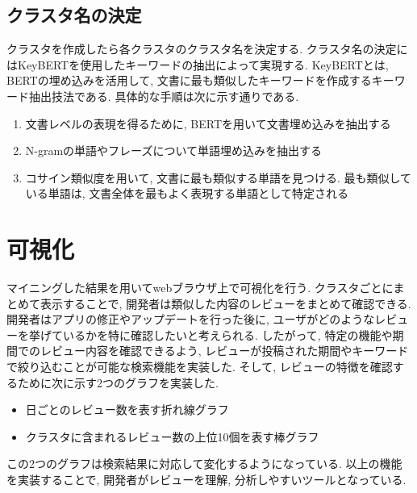 \subsection{クラスタ名の決定}
クラスタを作成したら各クラスタのクラスタ名を決定する. 
クラスタ名の決定にはKeyBERT\cite{keybert}を使用したキーワードの抽出によって実現する. KeyBERTとは, BERTの埋め込みを活用して, 文書に最も類似したキーワードを作成するキーワード抽出技法である. 
具体的な手順は次に示す通りである. 

\begin{enumerate}
  \item 文書レベルの表現を得るために, BERTを用いて文書埋め込みを抽出する
  \item N-gramの単語やフレーズについて単語埋め込みを抽出する
  \item コサイン類似度を用いて, 文書に最も類似する単語を見つける. 最も類似している単語は, 文書全体を最もよく表現する単語として特定される
\end{enumerate}


\section{可視化}
マイニングした結果を用いてwebブラウザ上で可視化を行う. クラスタごとにまとめて表示することで, 開発者は類似した内容のレビューをまとめて確認できる. 
開発者はアプリの修正やアップデートを行った後に, ユーザがどのようなレビューを挙げているかを特に確認したいと考えられる. したがって, 特定の機能や期間でのレビュー内容を確認できるよう, レビューが投稿された期間やキーワードで絞り込むことが可能な検索機能を実装した. 
そして, レビューの特徴を確認するために次に示す2つのグラフを実装した.
\begin{itemize}
  \item 日ごとのレビュー数を表す折れ線グラフ
  \item クラスタに含まれるレビュー数の上位10個を表す棒グラフ
\end{itemize}
この2つのグラフは検索結果に対応して変化するようになっている. 以上の機能を実装することで, 開発者がレビューを理解, 分析しやすいツールとなっている. 